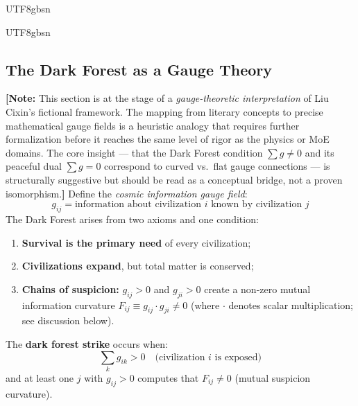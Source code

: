 \documentclass[11pt,a4paper]{article}
\begin{document}
\begin{CJK}{UTF8}{gbsn}
{\begin{CJK}{UTF8}{gbsn}
\subsection{The Dark Forest as a Gauge Theory}
\textbf{[Note:} This section is at the stage of a \textit{gauge-theoretic interpretation}
of Liu Cixin's fictional framework. The mapping from literary concepts to precise
mathematical gauge fields is a heuristic analogy that requires further formalization
before it reaches the same level of rigor as the physics or MoE domains. The core
insight --- that the Dark Forest condition $\sum g \neq 0$ and its peaceful dual
$\sum g = 0$ correspond to curved vs.\ flat gauge connections --- is structurally
suggestive but should be read as a conceptual bridge, not a proven isomorphism.\textbf{]}
Define the \textit{cosmic information gauge field}:
\begin{equation}
    g_{ij} = \text{information about civilization $i$ known by civilization $j$}
\end{equation}
The Dark Forest arises from two axioms and one condition:
\begin{enumerate}[label=\textbf{Axiom \arabic*:}]
    \item \textbf{Survival is the primary need} of every civilization;
    \item \textbf{Civilizations expand}, but total matter is conserved;
    \item \textbf{Chains of suspicion:} $g_{ij} > 0$ and $g_{ji} > 0$ create
          a non-zero mutual information curvature $F_{ij} \equiv g_{ij} \cdot g_{ji} \neq 0$
          (where $\cdot$ denotes scalar multiplication; see discussion below).
\end{enumerate}
The \textbf{dark forest strike} occurs when:
\begin{equation}
    \sum_{k} g_{ik} > 0 \quad \text{(civilization $i$ is exposed)}
\end{equation}
and at least one $j$ with $g_{ij} > 0$ computes that $F_{ij} \neq 0$ (mutual suspicion curvature).

\end{CJK}}
\end{CJK}
\end{document}
